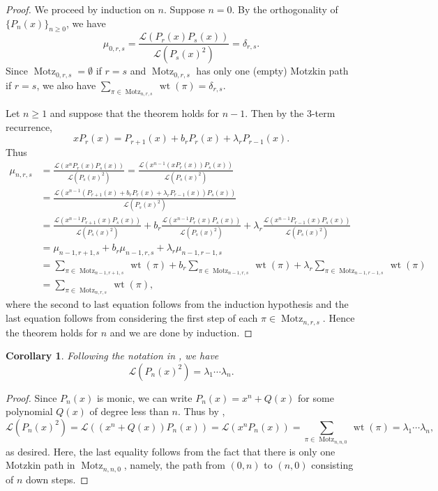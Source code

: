 \documentclass[oneside]{book}
\numberwithin{equation}{section}
\newtheorem{cor}[thm]{Corollary}
\theoremstyle{definition}
\newcommand\Motz{\operatorname{Motz}}
\newcommand\LL{\mathcal{L}}
\newcommand\wt{\operatorname{wt}}
\begin{document}
\begin{proof}
  We proceed by induction on \( n \).
  Suppose \( n=0 \). By the orthogonality of \( \{ P_n(x) \}_{n\ge 0} \),
  we have
  \[
    \mu_{0,r,s} = \frac{\LL(P_r(x)P_s(x))}{\LL(P_s(x)^2)} = \delta_{r,s}.
  \]
  Since \( \Motz_{0,r,s} = \emptyset \) if \( r=s \) and
  \( \Motz_{0,r,s} \) has only one (empty) Motzkin path if \( r=s \),
  we also have
  \( \sum_{\pi\in \Motz_{n,r,s}} \wt(\pi) = \delta_{r,s} \).

  Let \( n\ge1 \) and suppose that the theorem holds for \( n-1 \).
  Then by the 3-term recurrence,
  \[
    xP_r(x) = P_{r+1}(x) + b_rP_r(x) + \lambda_rP_{r-1}(x).
  \]
  Thus
  \begin{align*}
    \mu_{n,r,s}
    &= \frac{\LL(x^n P_r(x) P_s(x))}{\LL(P_s(x)^2)}
      = \frac{\LL(x^{n-1} (xP_r(x)) P_s(x))}{\LL(P_s(x)^2)}\\
    &=\frac{\LL(x^{n-1} (P_{r+1}(x) + b_rP_r(x) + \lambda_rP_{r-1}(x)) P_s(x))}{\LL(P_s(x)^2)} \\
    &= \frac{\LL(x^{n-1} P_{r+1}(x)P_s(x))}{\LL(P_s(x)^2)}
      + b_r\frac{\LL(x^{n-1} P_r(x)P_s(x))}{\LL(P_s(x)^2)}
      + \lambda_r \frac{\LL(x^{n-1} P_{r-1}(x)P_s(x))}{\LL(P_s(x)^2)}\\
    &= \mu_{n-1,r+1,s} + b_r\mu_{n-1,r,s} + \lambda_r \mu_{n-1,r-1,s}\\
    &= \sum_{\pi\in \Motz_{n-1,r+1,s}} \wt(\pi)
    + b_r \sum_{\pi\in \Motz_{n-1,r,s}} \wt(\pi)
    + \lambda_r \sum_{\pi\in \Motz_{n-1,r-1,s}} \wt(\pi)\\
      &=      \sum_{\pi\in \Motz_{n,r,s}} \wt(\pi),
  \end{align*}
  where the second to last equation follows from the induction
  hypothesis and the last equation follows from considering the first
  step of each \( \pi\in \Motz_{n,r,s} \). Hence the theorem holds for
  \( n \) and we are done by induction.
\end{proof}

\begin{cor}
  Following the notation in , we have
  \[
    \LL(P_n(x)^2) = \lambda_1 \cdots \lambda_n.
  \]
\end{cor}

\begin{proof}
  Since \( P_n(x) \) is monic, we can write \( P_n(x) = x^n + Q(x) \)
  for some polynomial \( Q(x) \) of degree less than \( n \). Thus
  by ,
  \[
    \LL(P_n(x)^2) = \LL((x^n + Q(x))P_n(x)) = \LL(x^n P_n(x))
    = \sum_{\pi\in \Motz_{n,n,0}} \wt(\pi) = \lambda_1 \cdots \lambda_n,
  \]
  as desired. Here, the last equality follows from the fact that there
  is only one Motzkin path in \( \Motz_{n,n,0} \), namely, the path
  from \( (0,n) \) to \( (n,0) \) consisting of \( n \) down steps.
\end{proof}
\end{document}
